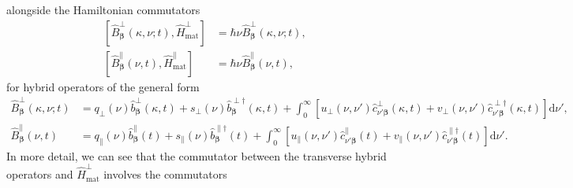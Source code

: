 \documentclass{article}
\begin{document}
alongside the Hamiltonian commutators
\begin{equation}\label{eq:hybridOperatorHamiltonianCommutator1}
\begin{split}
\left[\hat{B}_{\bm{\beta}}^\perp(\kappa,\nu;t),\hat{H}_\mathrm{mat}^\perp\right] &= \hbar\nu\hat{B}_{\bm{\beta}}^\perp(\kappa,\nu;t),\\
\left[\hat{B}_{\bm{\beta}}^\parallel(\nu,t),\hat{H}_\mathrm{mat}^\parallel\right] &= \hbar\nu\hat{B}_{\bm{\beta}}^\parallel(\nu,t),
\end{split}
\end{equation}
for hybrid operators of the general form
\begin{equation}\label{eq:hybridOperatorsGeneralForm}
\begin{split}
\hat{B}_{\bm{\beta}}^\perp(\kappa,\nu;t) &= q_\perp(\nu)\hat{b}_{\bm{\beta}}^\perp(\kappa,t) + s_\perp(\nu)\hat{b}_{\bm{\beta}}^{\perp\dagger}(\kappa,t) + \int_0^\infty\left[u_\perp(\nu,\nu')\hat{c}_{\nu'\bm{\beta}}^\perp(\kappa,t) + v_\perp(\nu,\nu')\hat{c}_{\nu'\bm{\beta}}^{\perp\dagger}(\kappa,t)\right]\mathrm{d}\nu',\\
\hat{B}_{\bm{\beta}}^\parallel(\nu,t) &= q_\parallel(\nu)\hat{b}_{\bm{\beta}}^\parallel(t) + s_\parallel(\nu)\hat{b}_{\bm{\beta}}^{\parallel\dagger}(t) + \int_0^\infty\left[u_\parallel(\nu,\nu')\hat{c}_{\nu'\bm{\beta}}^\parallel(t) + v_\parallel(\nu,\nu')\hat{c}_{\nu'\bm{\beta}}^{\parallel\dagger}(t)\right]\mathrm{d}\nu'.
\end{split}
\end{equation}
In more detail, we can see that the commutator between the transverse hybrid operators and $\hat{H}_\mathrm{mat}^\perp$ involves the commutators 
\end{document}
